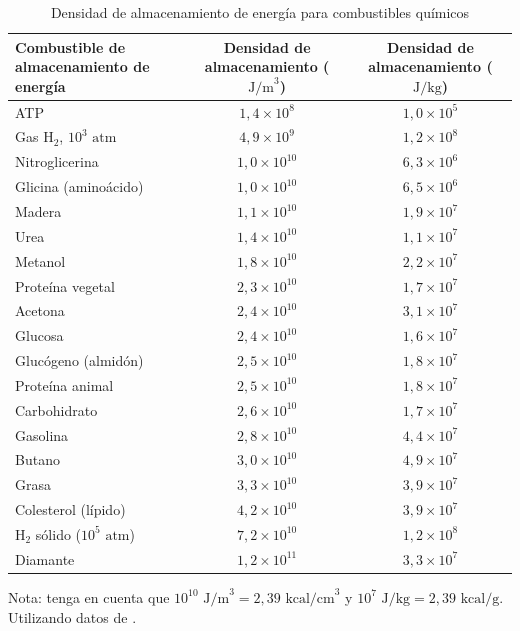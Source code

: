 \documentclass[12pt]{book}
\begin{document}
\begin{table}[htbp]
\centering
\caption{Densidad de almacenamiento de energía para combustibles químicos}
\label{tab:63}
\small
\begin{tabularx}{\textwidth}{Xcc}
\toprule
\textbf{Combustible de almacenamiento de energía} & \textbf{Densidad de almacenamiento ($\text{J/m}^3$)} & \textbf{Densidad de almacenamiento ($\text{J/kg}$)} \\
\midrule
ATP & $1,4 \times 10^8$ & $1,0 \times 10^5$ \\
Gas H$_2$, $10^3\text{ atm}$ & $4,9 \times 10^9$ & $1,2 \times 10^8$ \\
Nitroglicerina & $1,0 \times 10^{10}$ & $6,3 \times 10^6$ \\
Glicina (aminoácido) & $1,0 \times 10^{10}$ & $6,5 \times 10^6$ \\
Madera & $1,1 \times 10^{10}$ & $1,9 \times 10^7$ \\
Urea & $1,4 \times 10^{10}$ & $1,1 \times 10^7$ \\
Metanol & $1,8 \times 10^{10}$ & $2,2 \times 10^7$ \\
Proteína vegetal & $2,3 \times 10^{10}$ & $1,7 \times 10^7$ \\
Acetona & $2,4 \times 10^{10}$ & $3,1 \times 10^7$ \\
Glucosa & $2,4 \times 10^{10}$ & $1,6 \times 10^7$ \\
Glucógeno (almidón) & $2,5 \times 10^{10}$ & $1,8 \times 10^7$ \\
Proteína animal & $2,5 \times 10^{10}$ & $1,8 \times 10^7$ \\
Carbohidrato & $2,6 \times 10^{10}$ & $1,7 \times 10^7$ \\
Gasolina & $2,8 \times 10^{10}$ & $4,4 \times 10^7$ \\
Butano & $3,0 \times 10^{10}$ & $4,9 \times 10^7$ \\
Grasa & $3,3 \times 10^{10}$ & $3,9 \times 10^7$ \\
Colesterol (lípido) & $4,2 \times 10^{10}$ & $3,9 \times 10^7$ \\
H$_2$ sólido ($10^5\text{ atm}$) & $7,2 \times 10^{10}$ & $1,2 \times 10^8$ \\
Diamante & $1,2 \times 10^{11}$ & $3,3 \times 10^7$ \\
\bottomrule
\end{tabularx}
\begin{flushleft}
    \small Nota: tenga en cuenta que $10^{10}\text{ J/m}^3 = 2,39\text{ kcal/cm}^3$ y $10^7\text{ J/kg} = 2,39\text{ kcal/g}$.\\
    Utilizando datos de \cite{38}.
\end{flushleft}
\end{table}
\end{document}
